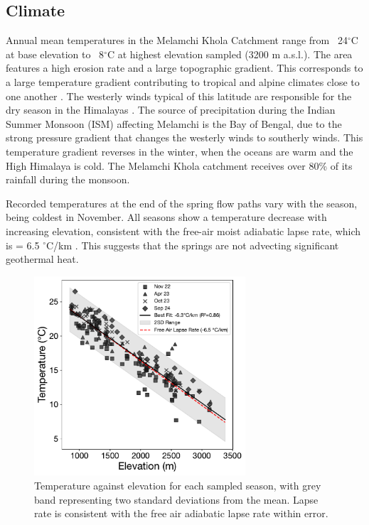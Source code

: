 \subsection{Climate}

Annual mean temperatures in the Melamchi Khola Catchment range from ~24$^{\circ}$C at base elevation to ~8$^{\circ}$C at highest elevation sampled (3200 m a.s.l.). The area features a high erosion rate and a large topographic gradient. This corresponds to a large temperature gradient contributing to tropical and alpine climates close to one another \parencite{kattelTemperatureLapseRate2013}. The westerly winds typical of this latitude are responsible for the dry season in the Himalayas \parencite{bookhagenCompleteHimalayanHydrological2010}. The source of precipitation during the Indian Summer Monsoon (ISM) affecting Melamchi is the Bay of Bengal, due to the strong pressure gradient that changes the westerly winds to southerly winds. This temperature gradient reverses in the winter, when the oceans are warm and the High Himalaya is cold.  The Melamchi Khola catchment receives over 80\% of its rainfall during the monsoon.

\bsk

Recorded temperatures at the end of the spring flow paths vary with the season, being coldest in November. All seasons show a temperature decrease with increasing elevation, consistent with the free-air moist adiabatic lapse rate, which is = 6.5 $^{\circ}$C/km \parencite{barryAtmosphereWeatherClimate2009}. This suggests that the springs are not advecting significant geothermal heat.

\begin{figure}[h]
    \centering
    \includegraphics[width=0.7\textwidth]{Temperature_Elevation_Season.pdf}
    \caption{Temperature against elevation for each sampled season, with grey band representing two standard deviations from the mean. Lapse rate is consistent with the free air adiabatic lapse rate within error.}
    \label{fig:temperature}
\end{figure}

